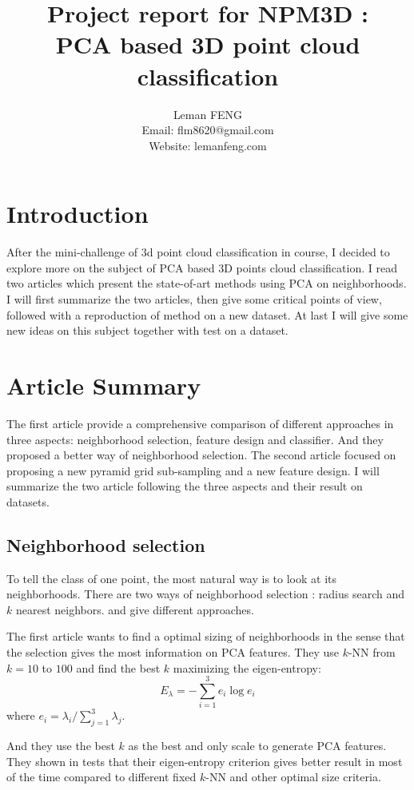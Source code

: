\documentclass{article}
\title{Project report for NPM3D : \\PCA based 3D point cloud classification}
\author{Leman FENG\\ Email: flm8620@gmail.com\\Website: lemanfeng.com}
\begin{document}
\maketitle
\section{Introduction}
After the mini-challenge of 3d point cloud classification in course, I decided to explore more on the subject of PCA based 3D points cloud classification. I read two articles \cite{weinmann2015} \cite{hackel2016fast} which present the state-of-art methods using PCA on neighborhoods. I will first summarize the two articles, then give some critical points of view, followed with a reproduction of method \cite{hackel2016fast} on a new dataset. At last I will give some new ideas on this subject together with test on a dataset.

\section{Article Summary}
The first article \cite{weinmann2015} provide a comprehensive comparison of different approaches in three aspects: neighborhood selection, feature design and classifier. And they proposed a better way of neighborhood selection. The second article \cite{hackel2016fast} focused on proposing a new pyramid grid sub-sampling and a new feature design. I will summarize the two article following the three aspects and their result on datasets.
\subsection{Neighborhood selection}
To tell the class of one point, the most natural way is to look at its neighborhoods. There are two ways of neighborhood selection : radius search and $k$ nearest neighbors. \cite{weinmann2015} and \cite{hackel2016fast} give different approaches. 

The first article \cite{weinmann2015} wants to find a optimal sizing of neighborhoods in the sense that the selection gives the most information on PCA features. They use $k$-NN from $k=10$ to $100$ and find the best $k$ maximizing the eigen-entropy:
\begin{equation}
E_\lambda = -\sum_{i=1}^{3} e_i \log e_i
\end{equation}
where $e_i = \lambda_i/\sum_{j=1}^{3} \lambda_j$.

And they use the best $k$ as the best and only scale to generate PCA features. They shown in tests that their eigen-entropy criterion gives better result in most of the time compared to different fixed $k$-NN and other optimal size criteria.
\end{document}
